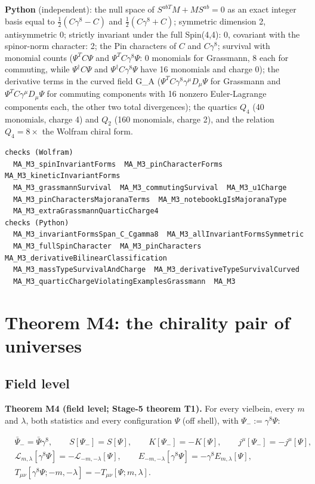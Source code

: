 \documentclass[11pt]{article}
\begin{document}
\textbf{Python} (independent): the null space of $S^{abT}M+MS^{ab}=0$ as an exact integer basis equal to $\tfrac12(C\gamma^8-C)$ and $\tfrac12(C\gamma^8+C)$; symmetric dimension 2, antisymmetric 0; strictly invariant under the full Spin(4,4): 0, covariant with the spinor-norm character: 2; the Pin characters of $C$ and $C\gamma^8$; survival with monomial counts ($\Psi^TC\Psi$ and $\Psi^TC\gamma^8\Psi$: 0 monomials for Grassmann, 8 each for commuting, while $\Psi^\dagger C\Psi$ and $\Psi^\dagger C\gamma^8\Psi$ have 16 monomials and charge 0); the derivative terms in the curved field G\_A ($\Psi^TC\gamma^8\gamma^\mu D_\mu\Psi$ for Grassmann and $\Psi^TC\gamma^\mu D_\mu\Psi$ for commuting components with 16 nonzero Euler-Lagrange components each, the other two total divergences); the quartics $Q_4$ (40 monomials, charge 4) and $Q_2$ (160 monomials, charge 2), and the relation $Q_4=8\times$ the Wolfram chiral form.

\begin{Verbatim}[fontsize=\small]
checks (Wolfram)
  MA_M3_spinInvariantForms  MA_M3_pinCharacterForms  MA_M3_kineticInvariantForms
  MA_M3_grassmannSurvival  MA_M3_commutingSurvival  MA_M3_u1Charge
  MA_M3_pinCharactersMajoranaTerms  MA_M3_notebookLgIsMajoranaType
  MA_M3_extraGrassmannQuarticCharge4
checks (Python)
  MA_M3_invariantFormsSpan_C_Cgamma8  MA_M3_allInvariantFormsSymmetric
  MA_M3_fullSpinCharacter  MA_M3_pinCharacters  MA_M3_derivativeBilinearClassification
  MA_M3_massTypeSurvivalAndCharge  MA_M3_derivativeTypeSurvivalCurved
  MA_M3_quarticChargeViolatingExamplesGrassmann  MA_M3
\end{Verbatim}

\section{Theorem M4: the chirality pair of universes}

\subsection{Field level}

\textbf{Theorem M4 (field level; Stage-5 theorem T1).} For every vielbein, every $m$ and $\lambda$, both statistics and every configuration $\Psi$ (off shell), with $\Psi_-:=\gamma^8\Psi$:

\[
\begin{aligned}
&\bar\Psi_-=\bar\Psi\gamma^8,\qquad S[\Psi_-]=S[\Psi],\qquad K[\Psi_-]=-K[\Psi],\qquad j^\mu[\Psi_-]=-j^\mu[\Psi],\\
&\mathcal L_{m,\lambda}[\gamma^8\Psi]=-\mathcal L_{-m,-\lambda}[\Psi],\qquad E_{-m,-\lambda}[\gamma^8\Psi]=-\gamma^8E_{m,\lambda}[\Psi],\\
&T_{\mu\nu}[\gamma^8\Psi;-m,-\lambda]=-T_{\mu\nu}[\Psi;m,\lambda].
\end{aligned}
\]
\end{document}
